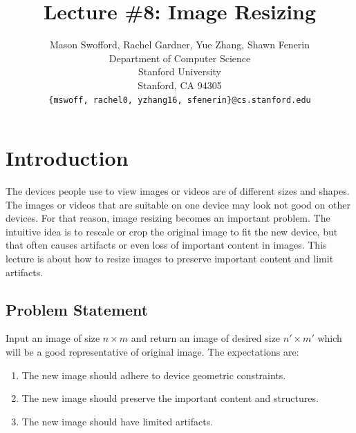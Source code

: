 \documentclass{article}
\title{Lecture \#8: Image Resizing}
\author{
  Mason Swofford, Rachel Gardner, Yue Zhang, Shawn Fenerin \\
  Department of Computer Science\\
  Stanford University\\
  Stanford, CA 94305 \\
  \texttt{\{mswoff, rachel0, yzhang16, sfenerin\}@cs.stanford.edu} \\
}
\begin{document}
\maketitle

\section{Introduction}
The devices people use to view images or videos are of different sizes and shapes. The images or videos that are suitable on one device may look not good on other devices. For that reason, image resizing becomes an important problem. The intuitive idea is to rescale or crop the original image to fit the new device, but that often causes artifacts or even loss of important content in images. This lecture is about how to resize images to preserve important content and limit artifacts.

\subsection{Problem Statement}
Input an image of size $n\times m$ and return an image of desired size $n'\times m'$ which will be a good representative of original image. The expectations are:
\begin{enumerate}
\item The new image should adhere to device geometric constraints.
\item The new image should preserve the important content and structures.
\item The new image should have limited artifacts.
\end{enumerate}
\end{document}
